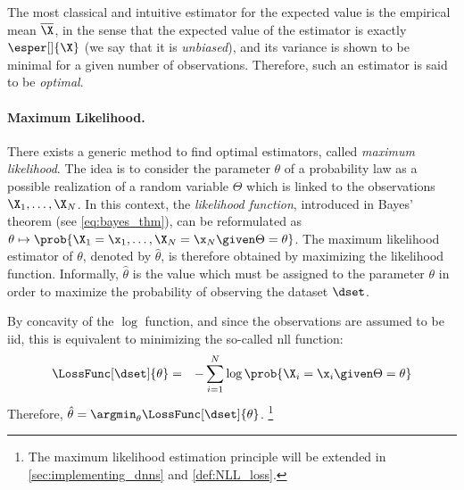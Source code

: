 The most classical and intuitive estimator for the expected value is the empirical mean \(\overline{\X}\), in the sense that the expected value of the estimator is exactly \(\esper[]{\X}\) (we say that it is \emph{unbiased}), and its variance is shown to be minimal for a given number of observations.
Therefore, such an estimator is said to be \emph{optimal}.

\paragraph{Maximum Likelihood.}
\label{sec:max_like}
There exists a generic method to find optimal estimators, called \emph{maximum likelihood}.
The idea is to consider the parameter \(\theta\) of a probability law as a possible realization of a random variable \(\Theta\) which is linked to the observations \(\X_1, \ldots, \X_N\).
In this context, the \emph{likelihood function}, introduced in Bayes' theorem (see \autoref{eq:bayes_thm}), can be reformulated as \(\theta \mapsto \prob{\X_1=\x_1, \ldots, \X_N=\x_N \given \Theta = \theta}\).
The maximum likelihood estimator of \(\theta\), denoted by \(\hat{\theta}\), is therefore obtained by maximizing the likelihood function.
Informally, \(\hat{\theta}\) is the value which must be assigned to the parameter \(\theta\) in order to maximize the probability of observing the dataset \(\dset\).

By concavity of the \(\log\) function, and since the observations are assumed to be \gls{iid}, this is equivalent to minimizing the so-called \gls{nll} function:
\begin{eqnarray}
    \LossFunc[\dset]{\theta}
    & = & -\sum_{i=1}^N \log{\prob{\X_i=\x_i \given \Theta = \theta}}
\end{eqnarray}
Therefore, \(\hat{\theta} = \argmin_{\theta} \LossFunc[\dset]{\theta}\).%
\footnote{
    The maximum likelihood estimation principle will be extended in \autoref{sec:implementing_dnns} and \autoref{def:NLL_loss}.
}


